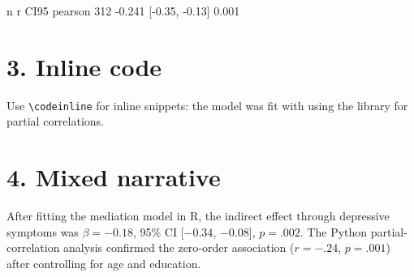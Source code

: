 \documentclass[11pt, a4paper]{article}
\begin{document}
\begin{codeoutput}
          n      r         CI95%
pearson  312  -0.241  [-0.35, -0.13]  0.001
\end{codeoutput}

\section*{3. Inline code}

Use \verb|\codeinline| for inline snippets:
the model was fit with  using
the  library for partial correlations.

\section*{4. Mixed narrative}

After fitting the mediation model in R, the indirect effect through
depressive symptoms was $\beta = -0.18$, 95\% CI [$-0.34$, $-0.08$],
$p = .002$. The Python partial-correlation analysis confirmed the
zero-order association ($r = -.24$, $p = .001$) after controlling for
age and education.
\end{document}
